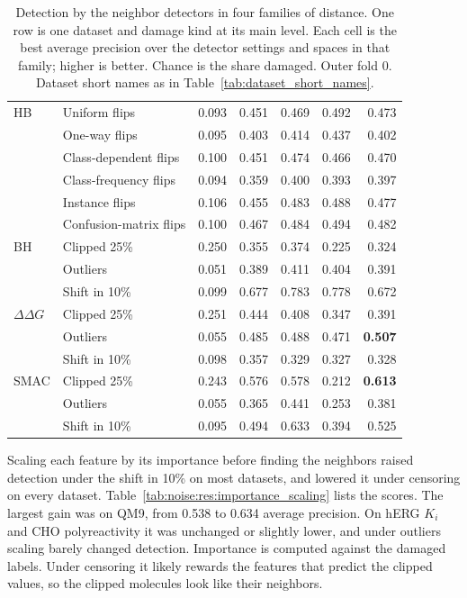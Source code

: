 \begin{table}[htbp]
\begin{tabular}{@{}llrrrrr@{}}
HB & Uniform flips & 0.093 & 0.451 & 0.469 & 0.492 & 0.473 \\
 & One-way flips & 0.095 & 0.403 & 0.414 & 0.437 & 0.402 \\
 & Class-dependent flips & 0.100 & 0.451 & 0.474 & 0.466 & 0.470 \\
 & Class-frequency flips &0.094 & 0.359 & 0.400 & 0.393 & 0.397 \\
 & Instance flips & 0.106 & 0.455 & 0.483 & 0.488 & 0.477 \\
 & Confusion-matrix flips & 0.100 & 0.467 & 0.484 & 0.494 & 0.482 \\
BH & Clipped 25\% & 0.250 & 0.355 & 0.374 & 0.225 & 0.324 \\
 & Outliers & 0.051 & 0.389 & 0.411 & 0.404 & 0.391 \\
 & Shift in 10\% & 0.099 & 0.677 & 0.783 & 0.778 & 0.672 \\
$\Delta\Delta G$ & Clipped 25\% & 0.251 & 0.444 & 0.408 & 0.347 & 0.391 \\
 & Outliers & 0.055 & 0.485 & 0.488 & 0.471 & \textbf{0.507} \\
 & Shift in 10\% & 0.098 & 0.357 & 0.329 & 0.327 & 0.328 \\
SMAC & Clipped 25\% & 0.243 & 0.576 & 0.578 & 0.212 & \textbf{0.613} \\
 & Outliers & 0.055 & 0.365 & 0.441 & 0.253 & 0.381 \\
 & Shift in 10\% & 0.095 & 0.494 & 0.633 & 0.394 & 0.525 \\
\bottomrule
\end{tabular}
\caption[Detection by distance family.]{Detection by the neighbor detectors in four families of distance. One row is one dataset and damage kind at its main level. Each cell is the best average precision over the detector settings and spaces in that family; higher is better. Chance is the share damaged. Outer fold 0. Dataset short names as in Table~\ref{tab:dataset_short_names}.}
\label{tab:noise:res:detect_families}
\end{table}

Scaling each feature by its importance before finding the neighbors raised detection under the shift in 10\% on most datasets, and lowered it under censoring on every dataset. Table~\ref{tab:noise:res:importance_scaling} lists the scores. The largest gain was on QM9, from 0.538 to 0.634 average precision. On hERG $K_i$ and CHO polyreactivity it was unchanged or slightly lower, and under outliers scaling barely changed detection. Importance is computed against the damaged labels. Under censoring it likely rewards the features that predict the clipped values, so the clipped molecules look like their neighbors.

